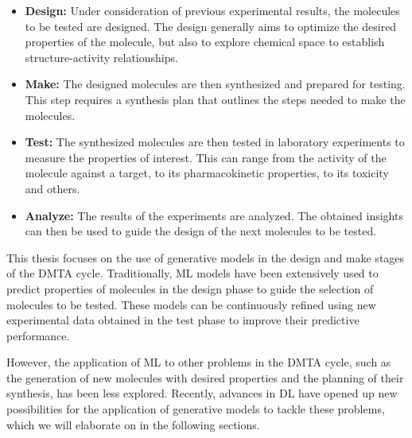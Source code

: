 \begin{itemize}
	\item \textbf{Design:} Under consideration of previous experimental results, the molecules to
	      be tested are designed. The design generally aims to optimize the desired properties of
	      the molecule, but also to explore chemical space to establish structure-activity relationships.
	\item \textbf{Make:} The designed molecules are then synthesized and prepared for testing. This
	      step requires a synthesis plan that outlines the steps needed to make the molecules.
	\item \textbf{Test:} The synthesized molecules are then tested in laboratory experiments to
	      measure the properties of interest. This can range from the activity of the molecule
	      against a target, to its pharmacokinetic properties, to its toxicity and others.
	\item \textbf{Analyze:} The results of the experiments are analyzed. The obtained insights
	      can then be used to guide the design of the next molecules to be tested.
\end{itemize}

This thesis focuses on the use of generative models in the design and make stages of the \ac{DMTA}
cycle. Traditionally, \ac{ML} models have been extensively used to predict properties of molecules
in the design phase to guide the selection of molecules to be tested. These models can be
continuously refined using new experimental data obtained in the test phase to improve their
predictive performance.

However, the application of \ac{ML} to other problems in the \ac{DMTA} cycle, such as the generation
of new molecules with desired properties and the planning of their synthesis, has been less
explored. Recently, advances in \ac{DL} have opened up new possibilities for the application of
generative models to tackle these problems, which we will elaborate on in the following sections.


